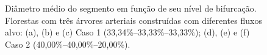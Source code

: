 \clearpage

\begin{figure}[!htb]
  \centering
  \captiondelim{: }
  \caption{Diâmetro médio do segmento em função de seu nível de bifurcação. 
  Florestas com três árvores arteriais construídas com diferentes fluxos alvo: 
  (a), (b) e (c) Caso 1 (33,34\%--33,33\%--33,33\%); (d), (e) e (f) Caso 2 (40,00\%--40,00\%--20,00\%).}
  
  \hspace{12pt}


\end{figure}
